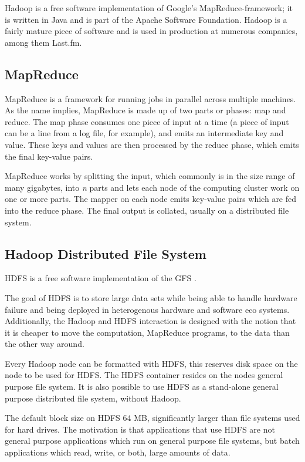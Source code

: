 Hadoop is a free software implementation of Google's MapReduce-framework; it is
written in Java and is part of the Apache Software Foundation. Hadoop is a
fairly mature piece of software and is used in production at numerous companies,
among them Last.fm.
\cite{hadoop}


\subsection{MapReduce}

MapReduce is a framework for running jobs in parallel across multiple
machines. As the name implies, MapReduce is made up of two parts or
phases: map and reduce. The map phase consumes one piece of input at a
time (a piece of input can be a line from a log file, for example), and
emits an intermediate key and value. These keys and values are then
processed by the reduce phase, which emits the final key-value pairs.

MapReduce works by splitting the input, which commonly is in the size
range of many gigabytes, into \textit{n} parts and lets each node of the
computing cluster work on one or more parts. The mapper on each node emits
key-value pairs which are fed into the reduce phase. The final output is
collated, usually on a distributed file system.


\subsection*{Hadoop Distributed File System}

HDFS is a free software implementation of the GFS \cite{gfs}.

The goal of HDFS is to store large data sets while being able to handle
hardware failure and being deployed in heterogenous hardware and software
eco systems. Additionally, the Hadoop and HDFS interaction is designed with
the notion that it is cheaper to move the computation, MapReduce programs,
to the data than the other way around.

Every Hadoop node can be formatted with HDFS, this reserves disk space on
the node to be used for HDFS. The HDFS container resides on the nodes
general purpose file system. It is also possible to use HDFS as a
stand-alone general purpose distributed file system, without Hadoop.

The default block size on HDFS 64 MB, significantly larger than
file systems used for hard drives. The motivation is that applications
that use HDFS are not general purpose applications which run on general
purpose file systems, but batch applications which read, write, or both,
large amounts of data.


